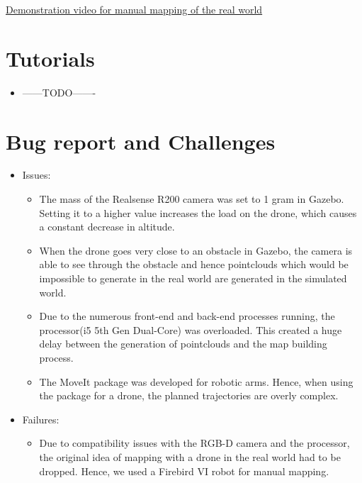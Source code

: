 \documentclass[a4paper,12pt,oneside]{book}
\begin{document}
\href{https://youtu.be/IJxsbCbQITg}{Demonstration video for manual mapping of the real world}

\section{Tutorials}
\begin{itemize}
	\item ------TODO-------
\end{itemize}

\section{Bug report and Challenges}
\begin{itemize}
	\item Issues:
		\begin{itemize}
			\item The mass of the Realsense R200 camera was set to 1 gram in Gazebo. Setting it to a higher value increases the load on the drone, which causes a constant decrease in altitude.
			\item When the drone goes very close to an obstacle in Gazebo, the camera is able to see through the obstacle and hence pointclouds which would be impossible to generate in the real world are generated in the simulated world.
			\item Due to the numerous front-end and back-end processes running, the processor(i5 5th Gen Dual-Core) was overloaded. This created a huge delay between the generation of pointclouds and the map building process.
			\item The MoveIt package was developed for robotic arms. Hence, when using the package for a drone, the planned trajectories are overly complex.
		\end{itemize}

	\item Failures:
		\begin{itemize}
			\item Due to compatibility issues with the RGB-D camera and the processor, the original idea of mapping with a drone in the real world had to be dropped. Hence, we used a Firebird VI robot for manual mapping.
		\end{itemize}
		

\end{itemize}
\end{document}
